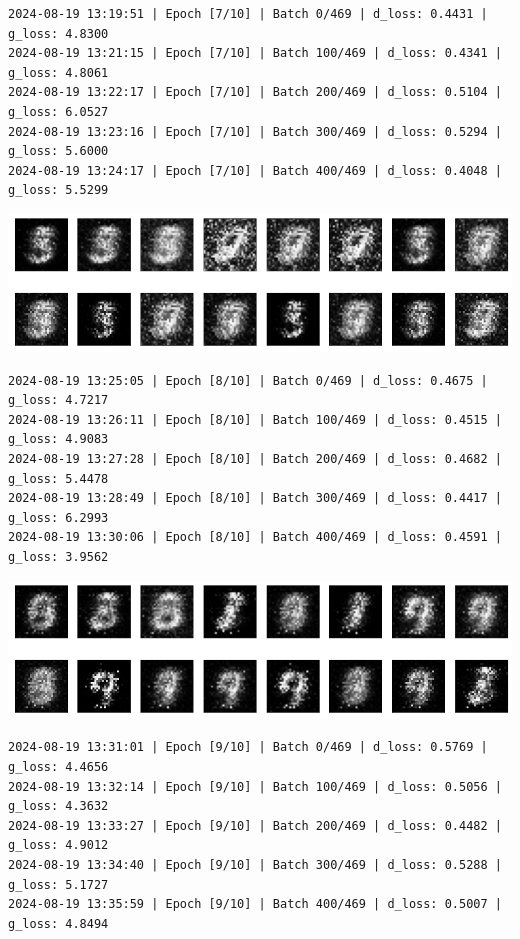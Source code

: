 \begin{lstlisting}
2024-08-19 13:19:51 | Epoch [7/10] | Batch 0/469 | d_loss: 0.4431 | g_loss: 4.8300
2024-08-19 13:21:15 | Epoch [7/10] | Batch 100/469 | d_loss: 0.4341 | g_loss: 4.8061
2024-08-19 13:22:17 | Epoch [7/10] | Batch 200/469 | d_loss: 0.5104 | g_loss: 6.0527
2024-08-19 13:23:16 | Epoch [7/10] | Batch 300/469 | d_loss: 0.5294 | g_loss: 5.6000
2024-08-19 13:24:17 | Epoch [7/10] | Batch 400/469 | d_loss: 0.4048 | g_loss: 5.5299
\end{lstlisting}

\includegraphics{img/genAdvNet/gan/output_24_13.png}

\begin{lstlisting}
2024-08-19 13:25:05 | Epoch [8/10] | Batch 0/469 | d_loss: 0.4675 | g_loss: 4.7217
2024-08-19 13:26:11 | Epoch [8/10] | Batch 100/469 | d_loss: 0.4515 | g_loss: 4.9083
2024-08-19 13:27:28 | Epoch [8/10] | Batch 200/469 | d_loss: 0.4682 | g_loss: 5.4478
2024-08-19 13:28:49 | Epoch [8/10] | Batch 300/469 | d_loss: 0.4417 | g_loss: 6.2993
2024-08-19 13:30:06 | Epoch [8/10] | Batch 400/469 | d_loss: 0.4591 | g_loss: 3.9562
\end{lstlisting}

\includegraphics{img/genAdvNet/gan/output_24_15.png}

\begin{lstlisting}
2024-08-19 13:31:01 | Epoch [9/10] | Batch 0/469 | d_loss: 0.5769 | g_loss: 4.4656
2024-08-19 13:32:14 | Epoch [9/10] | Batch 100/469 | d_loss: 0.5056 | g_loss: 4.3632
2024-08-19 13:33:27 | Epoch [9/10] | Batch 200/469 | d_loss: 0.4482 | g_loss: 4.9012
2024-08-19 13:34:40 | Epoch [9/10] | Batch 300/469 | d_loss: 0.5288 | g_loss: 5.1727
2024-08-19 13:35:59 | Epoch [9/10] | Batch 400/469 | d_loss: 0.5007 | g_loss: 4.8494
\end{lstlisting}

